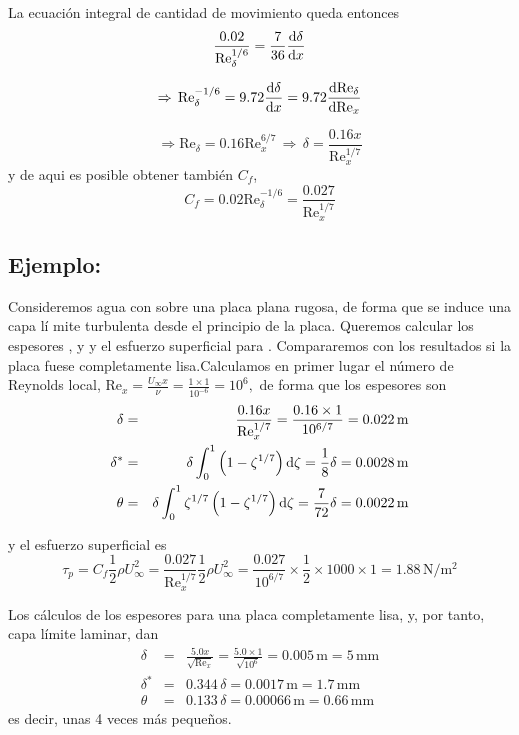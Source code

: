	
	La ecuación integral de cantidad de movimiento queda entonces 
	\[
	\frac{0.02}{\text{Re}_{\delta}^{1/6}}=\frac{7}{36}\frac{\textrm{d} \delta}{\textrm{d} x}
	\]
	
	\[
	\Rightarrow\,\text{Re}_{\delta}^{-1/6}=9.72\frac{\textrm{d} \delta}{\textrm{d} x}=9.72\frac{\textrm{d} \text{Re}_{\delta}}{\textrm{d} \text{Re}_{x}}
	\]
	
	\[
	\Rightarrow\text{Re}_{\delta}=0.16\text{Re}_{x}^{6/7}\,\Rightarrow\,\boxed{\delta=\frac{0.16x}{\text{Re}_{x}^{1/7}}}
	\]
	y de aqui es posible obtener también $C_{f}$, 
	\[
	C_{f}=0.02\text{Re}_{\delta}^{-1/6}=\frac{0.027}{\text{Re}_{x}^{1/7}}
	\]
	

	
	\subsection*{Ejemplo:}
		Consideremos agua con  sobre una placa plana rugosa, de forma que
		se induce una capa lí mite turbulenta desde el principio de la placa.
		Queremos calcular los espesores ,  y  y el esfuerzo superficial para
		. Compararemos con los resultados si la placa fuese completamente
		lisa.Calculamos en primer lugar el número de Reynolds local, $\text{Re}_{x}=\frac{U_{\infty}x}{\nu}=\frac{1\times1}{10^{-6}}=10^{6},$
		de forma que los espesores son 
		\begin{eqnarray*}
			\delta & = & \frac{0.16x}{\text{Re}_{x}^{1/7}}=\frac{0.16\times1}{10^{6/7}}=0.022\,\text{m}\\
			\delta^{*} & = & \delta\int_{0}^{1}\left(1-\zeta^{1/7}\right)\text{d}\zeta=\frac{1}{8}\delta=0.0028\,\text{m}\\
			\theta & = & \delta\int_{0}^{1}\zeta^{1/7}\left(1-\zeta^{1/7}\right)\text{d}\zeta=\frac{7}{72}\delta=0.0022\,\text{m}
		\end{eqnarray*}

		y el esfuerzo superficial es {\small{}
			\[
			\tau_{p}=C_{f}\frac{1}{2}\rho U_{\infty}^{2}=\frac{0.027}{\text{Re}_{x}^{1/7}}\frac{1}{2}\rho U_{\infty}^{2}=\frac{0.027}{10^{6/7}}\times\frac{1}{2}\times{1000}\times{1}=1.88\,\text{N}/\text{m}^{2}
			\]
		}
		
		Los cálculos de los espesores para una placa completamente lisa,
		y, por tanto, capa límite laminar, dan {\small{}
			\begin{eqnarray*}
				\delta & = & \frac{5.0x}{\sqrt{\text{Re}_{x}}}=\frac{5.0\times1}{\sqrt{10^{6}}}=0.005\,\text{m}=5\,\text{mm}\\
				\delta^{*} & = & 0.344\,\delta=0.0017\,\text{m}=1.7\,\text{mm}\\
				\theta & = & 0.133\,\delta=0.00066\,\text{m}=0.66\,\text{mm}
			\end{eqnarray*}
		} es decir, unas 4 veces más pequeños.
		

